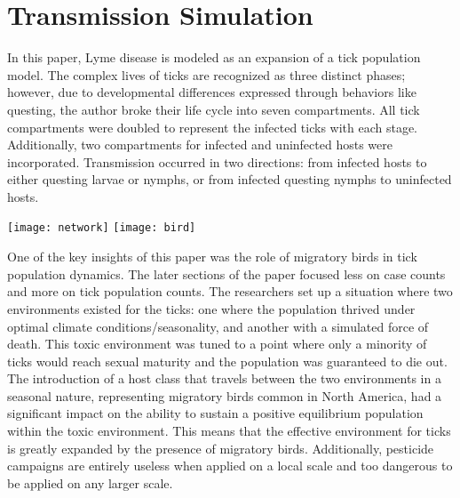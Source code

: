 \documentclass{report}
\begin{document}
\section{Transmission Simulation}
In this paper, Lyme disease is modeled as an expansion of a tick population model. The complex lives of ticks are recognized as three distinct phases; however, due to developmental differences expressed through behaviors like questing, the author broke their life cycle into seven compartments. All tick compartments were doubled to represent the infected ticks with each stage. Additionally, two compartments for infected and uninfected hosts were incorporated. Transmission occurred in two directions: from infected hosts to either questing larvae or nymphs, or from infected questing nymphs to uninfected hosts.\\
\begin{center}
        \texttt{[image: network]}
        \texttt{[image: bird]}
\end{center}
One of the key insights of this paper was the role of migratory birds in tick population dynamics. The later sections of the paper focused less on case counts and more on tick population counts. The researchers set up a situation where two environments existed for the ticks: one where the population thrived under optimal climate conditions/seasonality, and another with a simulated force of death. This toxic environment was tuned to a point where only a minority of ticks would reach sexual maturity and the population was guaranteed to die out.\\
The introduction of a host class that travels between the two environments in a seasonal nature, representing migratory birds common in North America, had a significant impact on the ability to sustain a positive equilibrium population within the toxic environment. This means that the effective environment for ticks is greatly expanded by the presence of migratory birds. Additionally, pesticide campaigns are entirely useless when applied on a local scale and too dangerous to be applied on any larger scale.\\
\end{document}
